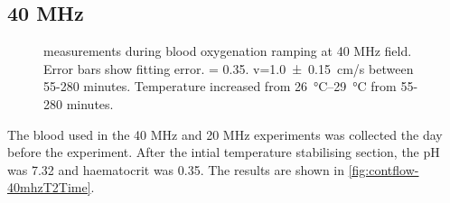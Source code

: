 \subsection{40 MHz}
\begin{figure}[thp]
\centering
{}

\caption[\Ttwo measurements during blood oxygenation ramping at 40 MHz field]{\Ttwo measurements during blood oxygenation ramping at 40 MHz field. Error bars show \Ttwo fitting error. \Hct = 0.35. v=\SI{1.0\pm0.15}{cm/s} between  55-280 minutes. Temperature increased from \SIrange{26}{29}{\celsius} from 55-280 minutes.}
\label{fig:contflow-40mhzT2Time}
\end{figure}

The blood used in the 40 MHz and 20 MHz experiments was collected the day before the experiment.
After the intial temperature stabilising section, the pH was \num{7.32} and haematocrit was \num{0.35}.
The results are shown in \autoref{fig:contflow-40mhzT2Time}.

